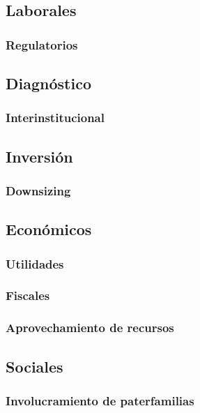 \documentclass[draft,12pt,headsepline,footsepline,paper=letter]{scrreprt}
\begin{document}
\subsection{Laborales}

\subsubsection{Regulatorios}

\subsection{Diagnóstico}

\subsubsection{Interinstitucional}

\subsection{Inversión}

\subsubsection{Downsizing}

\subsection{Económicos}

\subsubsection{Utilidades}

\subsubsection{Fiscales}

\subsubsection{Aprovechamiento de recursos}

\subsection{Sociales}

\subsubsection{Involucramiento de paterfamilias}
\end{document}
